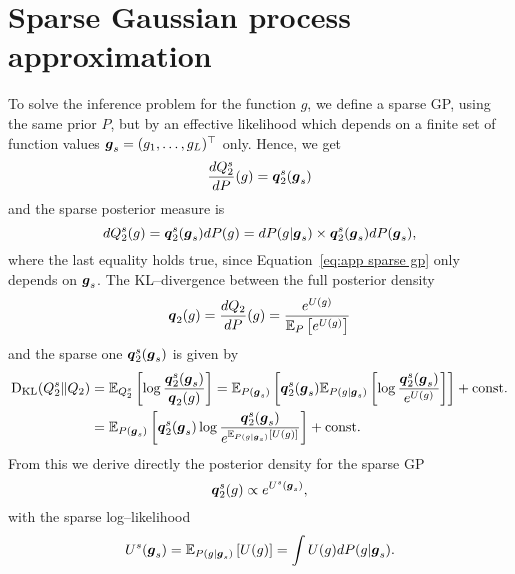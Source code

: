 \section{Sparse Gaussian process approximation}\label{app:sparse GP}
To solve the inference problem for the function $g$, we define a sparse GP, using the same 
prior $P$, but by an effective likelihood which depends on a finite set of function values $\boldsymbol{g}_s = (g_1,\ldots,g_L)^\top$ 
only. Hence, we get 
\begin{equation}\label{eq:app sparse gp}
\frac{dQ_2^s}{dP}(g) = \bs{q}^s_2(\bg_s) %
\end{equation}
and the sparse posterior measure is
\begin{equation}\label{eq:app posterior measure}
dQ^s_2(g) = \boldsymbol{q}^s_2(\boldsymbol{g}_s)dP(g)= dP(g\vert\boldsymbol{g}_s)\times \boldsymbol{q}^s_2(\boldsymbol{g}_s)dP(\boldsymbol{g}_s),
\end{equation}
where the last equality holds true, since Equation~\eqref{eq:app sparse gp} only depends on $\boldsymbol{g}_s$.
The KL--divergence between the full posterior density
\begin{equation}
\boldsymbol{q}_2(g) = \frac{dQ_2}{dP}(g) = \frac{e^{U(g)}}{\mathbb{E}_{P}\left[ e^{U(g)} \right]}
\end{equation}
and the sparse one $\boldsymbol{q}_2^s(\boldsymbol{g}_s)$ is given by
\begin{equation}\label{eq:app sparse kl}
\begin{split}
{\rm D}_{\rm KL}(Q_2^s\Vert Q_2) & = \mathbb{E}_{Q_2^s}\left[ \log \frac{\boldsymbol{q}_2^s(\boldsymbol{g}_s)}{\boldsymbol{q}_2(g)} \right] = \mathbb{E}_{P(\boldsymbol{g}_s)}\left[ \boldsymbol{q}_2^s(\boldsymbol{g}_s) \mathbb{E}_{P(g\vert\boldsymbol{g}_s)}\left[ \log \frac{\boldsymbol{q}_2^s(\boldsymbol{g}_s)}{e^{U(g)}} \right] \right] + {\rm const.} \\
& = \mathbb{E}_{P(\boldsymbol{g}_s)}\left[ \boldsymbol{q}_2^s(\boldsymbol{g}_s) \log \frac{\boldsymbol{q}_2^s(\boldsymbol{g}_s)}{e^{\mathbb{E}_{P(g\vert\boldsymbol{g}_s)}\left[ U(g) \right]}} \right] + {\rm const.}
\end{split}
\end{equation}
From this we derive directly the posterior density for the sparse GP
\begin{equation}
\boldsymbol{q}_2^s(g) \propto e^{U^s(\boldsymbol{g}_s)},
\end{equation}
with the sparse log--likelihood
\begin{equation}\label{eq:U function app}
U^s(\boldsymbol{g}_s) = \mathbb{E}_{P(g\vert \boldsymbol{g}_s)}\left[ U(g) \right] = \int U(g)dP(g\vert\boldsymbol{g}_s).
\end{equation}

